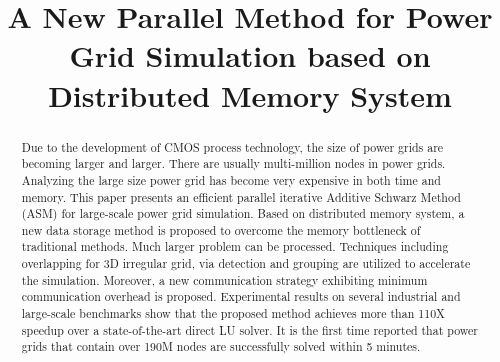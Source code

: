 \documentclass{sig-alternate}
\begin{document}
\title{A New Parallel Method for Power Grid Simulation based on Distributed Memory System}

\maketitle

\begin{comment}
This paper presents an efficient parallel Domain Decomposition method for large-scale power grid simulation. 
Based on multi-core platform, a new data storage strategy is proposed to overcome the memory bottleneck of traditional methods. 
Techniques as 3D irregular grid friendly overlapping, via detection as well as grouping techniques are utilized to accelerate the 
simulation. A new communication strategy is proposed and exhibits minimum communication overhead. Experimental results on several 
industrial and large-scale benchmarks show that the proposed method achieves more than 110X speedup over a state-of-the-art direct 
LU solver. Power grid containing over 190M nodes could be solved within 5 minutes.
\end{comment}

\begin{abstract}
Due to the development of CMOS process technology, the size of power grids are becoming larger and larger. There are usually 
multi-million nodes in power grids. Analyzing the large size power grid has become very expensive in both time and memory. This paper 
presents an efficient parallel iterative Additive Schwarz Method (ASM) for large-scale power grid simulation. Based on distributed 
memory system, a new 
data storage method is proposed to overcome the memory bottleneck of traditional methods. Much larger problem can be processed. 
Techniques including overlapping for 3D irregular grid, via detection and grouping are utilized to accelerate the 
simulation. Moreover, a new communication strategy exhibiting minimum communication overhead is proposed. Experimental results on 
several 
industrial and large-scale benchmarks show that the proposed method achieves more than 110X speedup over a state-of-the-art direct 
LU solver. It is the first time reported that power grids that contain over 190M nodes are successfully solved within 5 minutes.	
\end{abstract}
\end{document}
